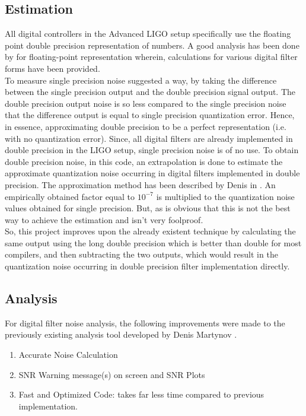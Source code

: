 \documentclass[a4paper,12pt]{article}
\begin{document}
	\subsection{Estimation}
	
All digital controllers in the Advanced LIGO setup specifically use the floating point double precision representation of numbers. A good analysis has been done by \cite{Matts} for floating-point representation wherein, calculations for various digital filter forms have been provided. \\
	To measure single precision noise \cite{Martynov} suggested a way, by taking the difference between the single precision output and the double precision signal output. The double precision output noise is so less compared to the single precision noise that the difference output is equal to single precision quantization error. Hence, in essence, approximating double precision to be a perfect representation (i.e. with no quantization error). Since, all digital filters are already implemented in double precision in the LIGO setup, single precision noise is of no use. To obtain double precision noise, in this code, an extrapolation is done to estimate the approximate quantization noise occurring in digital filters implemented in double precision. The approximation method has been described by Denis in \cite{Martynov2}. An empirically obtained factor equal to $10^{-7}$ is multiplied to the quantization noise values obtained for single precision. But, as is obvious that this is not the best way to achieve the estimation and isn't very foolproof.\\
 So, this project improves upon the already existent technique by calculating the same output using the long double precision which is better than double for most \cite{longdouble} compilers, and then subtracting the two outputs, which would result in the quantization noise occurring in double precision filter implementation directly. 
		
	\subsection{Analysis}
	For digital filter noise analysis, the following improvements were made to the previously existing analysis tool developed by Denis Martynov \cite{Martynov}.
	\begin{enumerate}
		\item Accurate Noise Calculation
		\item SNR Warning message(s) on screen and SNR Plots
		\item Fast and Optimized Code: takes far less time compared to previous implementation. 
	\end{enumerate}
\end{document}
